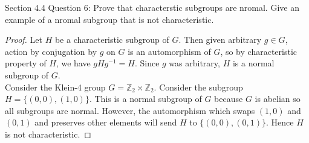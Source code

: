 Section 4.4 Question 6: Prove that characterstic subgroups are nromal. Give
an example of a nromal subgroup that is not characteristic.

\begin{proof}
  Let $H$ be a characteristic subgroup of $G$. Then given arbitrary $g\in
  G$, action by conjugation by $g$ on $G$ is an automorphism of $G$, so by
  characteristic property of $H$, we have $gHg^{-1}=H$. Since $g$ was
  arbitrary, $H$ is a normal subgroup of $G$. \\

  Consider the Klein-4 group $G=\mathbb{Z}_2\times\mathbb{Z}_2$. Consider
  the subgroup $H=\{(0,0),(1,0)\}$. This is a normal subgroup of $G$
  because $G$ is abelian so all subgroups are normal. However, the
  automorphism which swaps $(1,0)$ and $(0,1)$ and preserves other elements
  will send $H$ to $\{(0,0),(0,1)\}$. Hence $H$ is not characteristic.
\end{proof}

